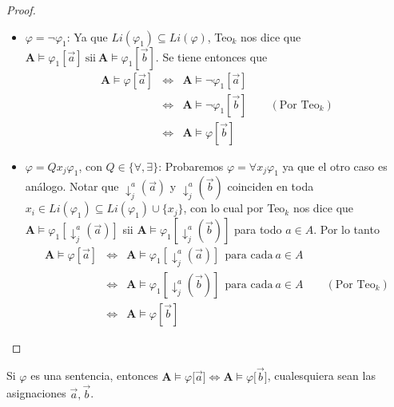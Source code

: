 \begin{proof}
\begin{itemize}
        \item $\varphi = \lnot \varphi_{1}$: Ya que $Li(\varphi_{1}) \subseteq Li(\varphi)$, Teo$_{k}$ nos dice que
        $\mathbf{A} \models \varphi_{1}[\vec{a}] \ \text{sii} \ \mathbf{A} \models \varphi_{1}[\vec{b}]$. Se tiene
        entonces que
        \begin{eqnarray*}
          \mathbf{A} \models \varphi[\vec{a}] &\Leftrightarrow& \mathbf{A} \models \lnot \varphi_{1}[\vec{a}] \\
          &\Leftrightarrow& \mathbf{A} \models \lnot \varphi_{1}[\vec{b}] \qquad (\text{Por Teo}_{k}) \\
          &\Leftrightarrow& \mathbf{A} \models \varphi[\vec{b}]
        \end{eqnarray*}

        \item $\varphi = Qx_{j}\varphi_{1}$, con $Q \in \{\forall, \exists\}$: Probaremos $\varphi = \forall x_{j}
        \varphi_{1}$ ya que el otro caso es análogo. Notar que $\downarrow_{j}^{a}(\vec{a})$ y $\downarrow_{j}^{a}
        (\vec{b})$ coinciden en toda $x_{i} \in Li(\varphi_{1}) \subseteq Li(\varphi_{1}) \cup \{x_{j}\}$, con lo cual
        por Teo$_{k}$ nos dice que $\mathbf{A} \models \varphi_{1}[\downarrow_{j}^{a}(\vec{a})]$ sii $\mathbf{A} \models
        \varphi_{1}[\downarrow_{j}^{a}(\vec{b})]$ para todo $a \in A$. Por lo tanto
        \begin{eqnarray*}
          \mathbf{A} \models \varphi[\vec{a}] &\Leftrightarrow& \mathbf{A} \models \varphi_{1}[\downarrow_{j}^{a}
            (\vec{a})] \ \ \text{para cada} \ a \in A \\
          &\Leftrightarrow& \mathbf{A} \models \varphi_{1}[\downarrow_{j}^{a}(\vec{b})] \ \ \text{para cada} \ a \in A
            \qquad (\text{Por Teo}_{k}) \\
          &\Leftrightarrow& \mathbf{A} \models \varphi[\vec{b}]
        \end{eqnarray*}
      \end{itemize}
  \end{proof}

  \begin{corollary} \label{corollary_46}
    \PN Si $\varphi$ es una sentencia, entonces $\mathbf{A} \models \varphi \lbrack \vec{a}] \Leftrightarrow \mathbf{A}
    \models \varphi \lbrack \vec{b}]$, cualesquiera sean las asignaciones $\vec{a}, \vec{b}$.
  \end{corollary}

